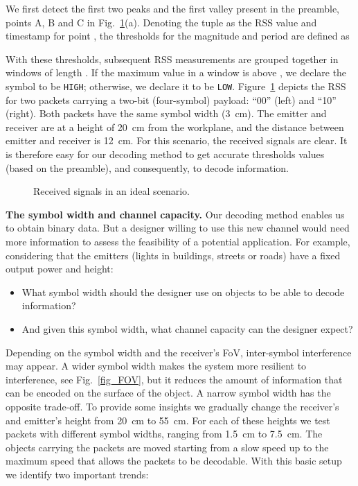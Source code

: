 \documentclass[10pt]{sig-alternate-05-2015}
\begin{document}
{We first detect the first two peaks and the first valley present in the preamble, points A, B and C in Fig.~\ref{fig_two_ids}(a). Denoting the tuple  as the RSS value and timestamp for point , the thresholds for the magnitude and period are defined as


With these thresholds, subsequent RSS measurements are grouped together in windows of length . If the maximum value in a window is above , we declare the symbol to be \texttt{HIGH}; otherwise, we declare it to be \texttt{LOW}. Figure~\ref{fig_two_ids} depicts the RSS for two packets carrying a two-bit (four-symbol) payload: ``00'' (left) and ``10'' (right). Both packets have the same symbol width (3~cm). The emitter and receiver are at a height of 20~cm from the workplane, and the distance between emitter and receiver is 12~cm. For this scenario, the received signals are clear. It is therefore easy for our decoding method to get accurate thresholds values (based on the preamble), and consequently, to decode information.

\begin{figure}[t]
	\hfill {}
	\vspace{-2mm}
	\caption {Received signals in an ideal scenario.} 
	\vspace{-3mm}
	\label{fig_two_ids}
\end{figure}

{\bf The symbol width and channel capacity.} Our decoding method enables us to obtain binary data. But a designer willing to use this new channel would need more information to assess the feasibility of a potential application. For example, considering that the emitters (lights in buildings, streets or roads) have a fixed output power and height:
\begin{itemize}
	\item What symbol width should the designer use on objects to be able to decode information? 
	\item And given this symbol width, what channel capacity can the designer expect? 
\end{itemize}
Depending on the symbol width and the receiver's FoV, inter-symbol interference may appear. A wider symbol width makes the system more resilient to interference, see Fig.~\ref{fig_FOV}, but it reduces the amount of information that can be encoded on the surface of the object. A narrow symbol width has the opposite trade-off. To provide some insights we gradually change the receiver's and emitter's height from 20~cm to 55~cm. For each of these heights we test packets with different symbol widths, ranging from 1.5~cm to 7.5~cm. The {objects carrying the} packets are moved starting from a slow speed up to the maximum speed that allows the packets to be decodable. With this basic setup we identify two important trends:

}
\end{document}
